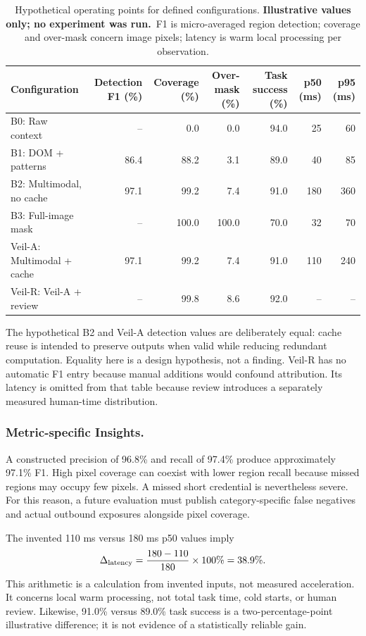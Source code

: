 \documentclass[conference]{IEEEtran}
\newcommand{\illustrative}{\textbf{Illustrative values only; no experiment was run.}}
\begin{document}
\begin{table}[t]
\centering\small
\caption{Hypothetical operating points for defined configurations. \illustrative\ F1 is micro-averaged region detection; coverage and over-mask concern image pixels; latency is warm local processing per observation.}
\label{tab:main}
\begin{tabular}{lrrrrrr}
\toprule
Configuration & Detection F1 (\%) & Coverage (\%) & Over-mask (\%) & Task success (\%) & p50 (ms) & p95 (ms)\\
\midrule
B0: Raw context & -- & 0.0 & 0.0 & 94.0 & 25 & 60\\
B1: DOM + patterns & 86.4 & 88.2 & 3.1 & 89.0 & 40 & 85\\
B2: Multimodal, no cache & 97.1 & 99.2 & 7.4 & 91.0 & 180 & 360\\
B3: Full-image mask & -- & 100.0 & 100.0 & 70.0 & 32 & 70\\
Veil-A: Multimodal + cache & 97.1 & 99.2 & 7.4 & 91.0 & 110 & 240\\
Veil-R: Veil-A + review & -- & 99.8 & 8.6 & 92.0 & -- & --\\
\bottomrule
\end{tabular}
\end{table}

The hypothetical B2 and Veil-A detection values are deliberately equal: cache reuse is intended to preserve outputs when valid while reducing redundant computation. Equality here is a design hypothesis, not a finding. Veil-R has no automatic F1 entry because manual additions would confound attribution. Its latency is omitted from that table because review introduces a separately measured human-time distribution.

\subsubsection{Metric-specific Insights.}
A constructed precision of 96.8\% and recall of 97.4\% produce approximately 97.1\% F1. High pixel coverage can coexist with lower region recall because missed regions may occupy few pixels. A missed short credential is nevertheless severe. For this reason, a future evaluation must publish category-specific false negatives and actual outbound exposures alongside pixel coverage.

The invented 110 ms versus 180 ms p50 values imply
\begin{equation}
 \Delta_{\rm latency}=\frac{180-110}{180}\times100\%=38.9\%.
\end{equation}
This arithmetic is a calculation from invented inputs, not measured acceleration. It concerns local warm processing, not total task time, cold starts, or human review. Likewise, 91.0\% versus 89.0\% task success is a two-percentage-point illustrative difference; it is not evidence of a statistically reliable gain.
\end{document}
